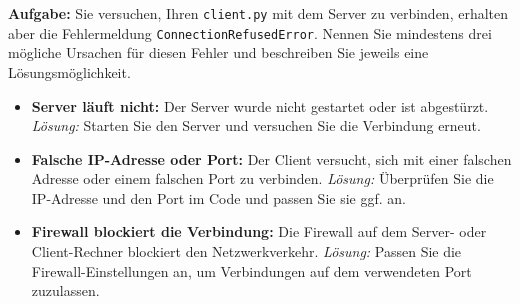\begin{myexercise}

    \textbf{Aufgabe:} Sie versuchen, Ihren \texttt{client.py} mit dem Server zu verbinden, erhalten aber die Fehlermeldung \texttt{ConnectionRefusedError}. Nennen Sie mindestens drei mögliche Ursachen für diesen Fehler und beschreiben Sie jeweils eine Lösungsmöglichkeit.

    \begin{myanswer}
        \begin{itemize}
            \item \textbf{Server läuft nicht:} Der Server wurde nicht gestartet oder ist abgestürzt. \textit{Lösung:} Starten Sie den Server und versuchen Sie die Verbindung erneut.
            \item \textbf{Falsche IP-Adresse oder Port:} Der Client versucht, sich mit einer falschen Adresse oder einem falschen Port zu verbinden. \textit{Lösung:} Überprüfen Sie die IP-Adresse und den Port im Code und passen Sie sie ggf. an.
            \item \textbf{Firewall blockiert die Verbindung:} Die Firewall auf dem Server- oder Client-Rechner blockiert den Netzwerkverkehr. \textit{Lösung:} Passen Sie die Firewall-Einstellungen an, um Verbindungen auf dem verwendeten Port zuzulassen.
        \end{itemize}
    \end{myanswer}
\end{myexercise}

\newcommand{\blank}[1]{\underline{\hspace{2cm}}}

